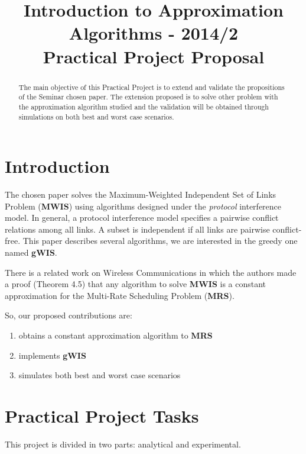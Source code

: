 \documentclass[conference]{IEEEtran}
\begin{document}
  \title{Introduction to Approximation Algorithms - 2014/2 \\ Practical Project Proposal}
  \author{
  }
  \maketitle
  \begin{abstract}
    The main objective of this Practical Project is to extend and validate 
    the propositions of the Seminar chosen paper. The extension proposed
    is to solve other problem with the approximation algorithm studied and
    the validation will be obtained through simulations on both best and worst case scenarios.
  \end{abstract}
  \section{Introduction}
    The chosen paper \cite{pengjun:2014} solves the Maximum-Weighted Independent Set of Links Problem ({\bf MWIS})
    using algorithms designed under the {\it protocol} interference model. 
    In general, a protocol interference model specifies a pairwise conflict relations among all links.
    A subset is independent if all links are pairwise conflict-free.
    This paper describes several algorithms, we are interested in the greedy one named {\bf gWIS}.

    There is a related work on Wireless Communications \cite{olga:2012} in which the authors made a proof (Theorem 4.5) that 
    any algorithm to solve {\bf MWIS} is a constant approximation for the Multi-Rate Scheduling Problem ({\bf MRS}).

    So, our proposed contributions are:
    \begin{enumerate} 
      \item obtains a constant approximation algorithm to {\bf MRS}
      \item implements {\bf gWIS}
      \item simulates both best and worst case scenarios
    \end{enumerate}
  \section{Practical Project Tasks}
    This project is divided in two parts: analytical and experimental.
\end{document}
